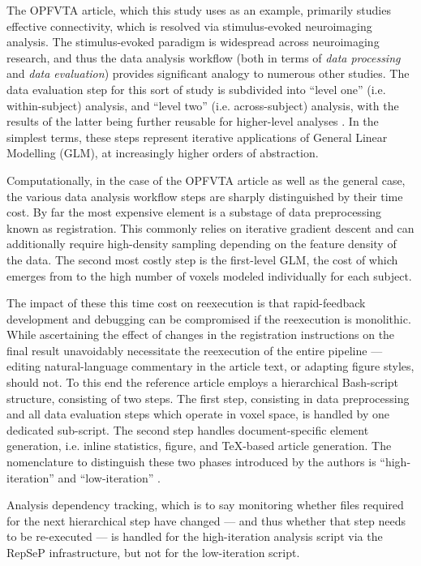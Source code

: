 The OPFVTA article, which this study uses as an example, primarily studies effective connectivity, which is resolved via stimulus-evoked neuroimaging analysis.
The stimulus-evoked paradigm is widespread across neuroimaging research, and thus the data analysis workflow (both in terms of \emph{data processing} and \emph{data evaluation}) provides significant analogy to numerous other studies.
The data evaluation step for this sort of study is subdivided into “level one” (i.e. within-subject) analysis, and “level two” (i.e. across-subject) analysis, with the results of the latter being further reusable for higher-level analyses \cite{Friston1995}.
In the simplest terms, these steps represent iterative applications of General Linear Modelling (GLM), at increasingly higher orders of abstraction.


Computationally, in the case of the OPFVTA article as well as the general case, the various data analysis workflow steps are sharply distinguished by their time cost.
By far the most expensive element is a substage of data preprocessing known as registration.
This commonly relies on iterative gradient descent and can additionally require high-density sampling depending on the feature density of the data.
The second most costly step is the first-level GLM, the cost of which emerges from to the high number of voxels modeled individually for each subject.

The impact of these this time cost on reexecution is that rapid-feedback development and debugging can be compromised if the reexecution is monolithic.
While ascertaining the effect of changes in the registration instructions on the final result unavoidably necessitate the reexecution of the entire pipeline — editing natural-language commentary in the article text, or adapting figure styles, should not.
To this end the reference article employs a hierarchical Bash-script structure, consisting of two steps.
The first step, consisting in data preprocessing and all data evaluation steps which operate in voxel space, is handled by one dedicated sub-script.
The second step handles document-specific element generation, i.e. inline statistics, figure, and TeX-based article generation.
The nomenclature to distinguish these two phases introduced by the authors is “high-iteration” and “low-iteration” \cite{repsep}.

Analysis dependency tracking, which is to say monitoring whether files required for the next hierarchical step have changed — and thus whether that step needs to be re-executed — is handled for the high-iteration analysis script via the RepSeP infrastructure, but not for the low-iteration script.


